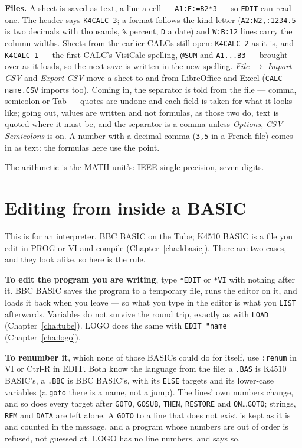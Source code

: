 \textbf{Files.} A sheet is saved as text, a line a cell ---
\verb|A1:F:=B2*3| --- so \verb|EDIT| can read one. The header says
\verb|K4CALC 3|; a format follows the kind letter (\verb|A2:N2,:1234.5| is
two decimals with thousands, \verb|%| percent, \verb|D| a date) and
\verb|W:B:12| lines carry the column widths. Sheets from the earlier CALCs
still open: \verb|K4CALC 2| as it is, and \verb|K4CALC 1| --- the first
CALC's VisiCalc spelling, \verb|@SUM| and \verb|A1...B3| --- brought over as
it loads, so the next save is written in the new spelling.
\emph{File} $\rightarrow$ \emph{Import CSV} and \emph{Export CSV} move a
sheet to and from LibreOffice and Excel (\verb|CALC name.CSV| imports too).
Coming in, the separator is told from the file --- comma, semicolon or Tab
--- quotes are undone and each field is taken for what it looks like; going
out, values are written and not formulas, as those two do, text is quoted
where it must be, and the separator is a comma unless \emph{Options},
\emph{CSV Semicolons} is on. A number with a decimal comma (\texttt{3,5} in a
French file) comes in as text: the formulas here use the point.

The arithmetic is the MATH unit's: IEEE single precision, seven digits.

\section{Editing from inside a BASIC}\label{sec:editfrombasic}
This is for an interpreter, BBC BASIC on the Tube; K4510 BASIC is a file
you edit in PROG or VI and compile (Chapter~\ref{cha:kbasic}). There are
two cases, and they look alike, so here is the rule.

\textbf{To edit the program you are writing}, type \verb|*EDIT| or
\verb|*VI| with nothing after it. BBC BASIC saves the program to a
temporary file, runs the editor on it, and loads it back when you leave
--- so what you type in the editor is what you \verb|LIST| afterwards.
Variables do not survive the round trip, exactly as with \verb|LOAD|
(Chapter~\ref{cha:tube}). LOGO does the same with
\verb|EDIT "name| (Chapter~\ref{cha:logo}).

\textbf{To renumber it}, which none of those BASICs could do for itself,
use \verb|:renum| in VI or Ctrl-R in EDIT. Both know the language from the
file: a \texttt{.BAS} is K4510 BASIC's, a \texttt{.BBC} is BBC
BASIC's, with its \verb|ELSE| targets and its lower-case variables (a
\texttt{goto} there is a name, not a jump). The lines' own numbers change,
and so does every target after \verb|GOTO|, \verb|GOSUB|, \verb|THEN|,
\verb|RESTORE| and \verb|ON|\ldots\verb|GOTO|; strings, \verb|REM| and
\verb|DATA| are left alone. A \verb|GOTO| to a line that does not exist is
kept as it is and counted in the message, and a program whose numbers are
out of order is refused, not guessed at. LOGO has no line numbers, and says
so.

